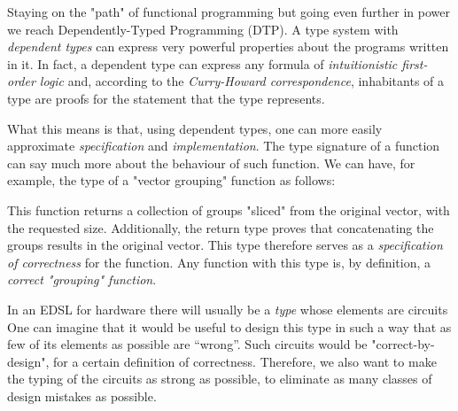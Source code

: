\documentclass[a4paper]{article}
\begin{document}
        Staying on the "path" of functional programming but going even further in power we reach
        Dependently-Typed Programming (DTP).
        A type system with \emph{dependent types} can express very powerful properties
        about the programs written in it.
        In fact, a dependent type can express any formula of \emph{intuitionistic first-order logic} and,
        according to the \emph{Curry-Howard correspondence},
        inhabitants of a type are proofs for the statement that the type represents.

        What this means is that, using dependent types, one can more easily approximate \emph{specification} and \emph{implementation}.
        The type signature of a function can say much more about the behaviour of such function.
        We can have, for example, the type of a "vector grouping" function as follows:


        This function returns a collection of groups "sliced" from the original vector, with the requested size.
        Additionally, the return type proves that concatenating the groups results in the original vector.
        This type therefore serves as a \emph{specification of correctness} for the function.
        Any function with this type is, by definition, a \emph{correct "grouping" function}.

        In an EDSL for hardware there will usually be a \emph{type} whose elements are circuits
        One can imagine that it would be useful to design this type in such a way that as few of its elements as possible are ``wrong''.
        Such circuits would be "correct-by-design", for a certain definition of correctness.
        Therefore, we also want to make the typing of the circuits as strong as possible,
        to eliminate as many classes of design mistakes as possible.

\end{document}
